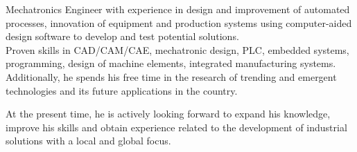 \begin{bodyfont}

  Mechatronics Engineer with experience in design and improvement of automated processes, innovation of equipment and production systems using computer-aided design software to develop and test potential solutions. 
  \\
  Proven skills in CAD/CAM/CAE, mechatronic design, PLC, embedded systems, programming, design of machine elements, integrated manufacturing systems. Additionally, he spends his free time in the research of trending and emergent technologies and its future applications in the country.
  
  At the present time, he is actively looking forward to expand his knowledge, improve his skills and obtain experience related to the development of industrial solutions with a local and global focus.

\end{bodyfont}